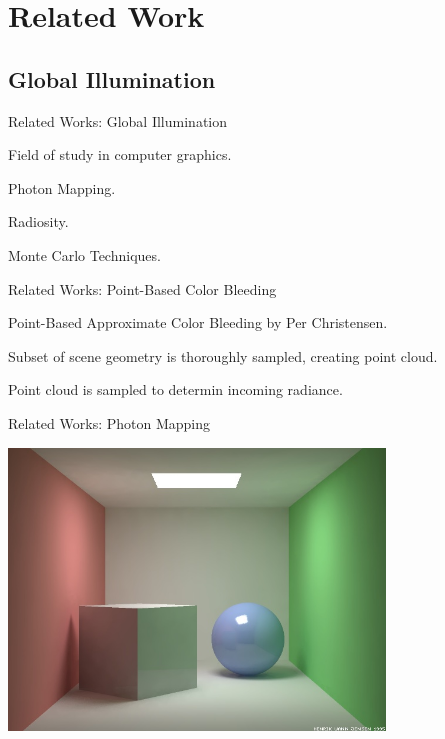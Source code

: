 \documentclass[compress,professionalfont]{beamer}
\begin{document}
\section{Related Work}
\subsection{Global Illumination}
\begin{frame}{Related Works: Global Illumination}

    Field of study in computer graphics.

    Photon Mapping.

    Radiosity.

    Monte Carlo Techniques.

\end{frame}




\begin{frame}{Related Works: Point-Based Color Bleeding}

    Point-Based Approximate Color Bleeding by Per Christensen.

    Subset of scene geometry is thoroughly sampled, creating point cloud.

    Point cloud is sampled to determin incoming radiance.

\end{frame}




\begin{frame}{Related Works: Photon Mapping}

    \includegraphics[width=100mm]{../img/external/ewr7_mcbox.jpg}

\end{frame}
\end{document}
